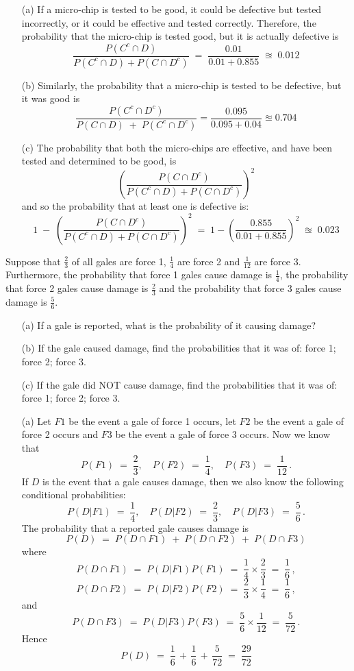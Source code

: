 \begin{ExerciseList}
\begin{itemize}
\item[(a)]
If a micro-chip is tested to be good, it could be defective but tested incorrectly, or it could be effective and tested correctly. Therefore, the probability that the micro-chip is tested good, but it is actually defective is
$$\frac{P(C^c\cap D)}{P(C^c\cap D)+P(C\cap D^c)}\;=\;\frac{0.01}{0.01+0.855}\;\approxeq\; 0.012$$
\item[(b)] 
Similarly,  the probability that a micro-chip is  tested to be defective, but it was good is
$$\frac{P(C^c\cap D^c)}{P(C\cap D)\;+\;P(C^c\cap
  D^c)}=\frac{0.095}{0.095+0.04} \approxeq 0.704$$
\item[(c)]
The  probability that  both  the micro-chips are effective, and have been
tested and determined to be good,  is
\[\left(\frac{P(C\cap D^c)}{P(C^c\cap D)+P(C\cap D^c)}\right)^2\]
and so  the probability that at least one is defective is:
$$1\;-\;\left(\frac{P(C\cap D^c)}{P(C^c\cap D)+P(C\cap
    D^c)}\right)^2\;=\;1-\left(\frac{0.855}{0.01+0.855 }\right)^2\;\approxeq\;0.023$$
\end{itemize}


\Exercise
Suppose that $\frac{2}{3}$  of all gales are  force 1, $\frac{1}{4}$  are force 2 and $\frac{1}{12}$  are force 3.  
Furthermore, the probability that force 1 gales cause damage is
$\frac{1}{4}$,  the probability that force 2 gales cause damage is
$\frac{2}{3}$  and  the probability that force 3 gales cause damage is
$\frac{5}{6}$.

\begin{itemize}
\item[(a)]If a  gale is reported,  what is the probability of it causing damage?
\item[(b)] If the gale caused damage, find  the probabilities that it
  was  of:  force 1;  force 2;  force 3.
\item[(c)] If the gale did  NOT cause damage, find  the probabilities
  that it was of: force 1; force 2; force 3.
\end{itemize}
\Answer
\begin{itemize}
\item[(a)] Let $F1$ be the event a gale of force 1 occurs, let $F2$
be the event a gale of force 2 occurs and $F3$ be the event a gale
of force 3 occurs.  Now we know that
\[ P(F1)\; =\; \frac{2}{3}, \quad  P(F2) \;= \;\frac{1}{4},  \quad P(F3) \;= \;\frac{1}{12}\,.\]
If $D$ is the event that a gale causes damage, then we also know the
following conditional probabilities:
\[ P(D|F1) \;= \;\frac{1}{4}, \quad  P(D|F2) \;=\; \frac{2}{3},  \quad  P(D|F3)\; = \;\frac{5}{6}\,.\]
The probability that a reported gale causes damage is
\[P(D)\;=\;P(D\cap F1)\;+\;P(D\cap F2)\;+\;P(D\cap F3)\]
where
\[P(D\cap F1)\;=\; P(D| F1)P(F1)\;=\;\frac{1}{4} \times \frac{2}{3}
\;=\; \frac{1}{6}\,, \]
\[P(D\cap F2)\;=\; P(D| F2)P(F2)\;=\;\frac{2}{3} \times \frac{1}{4}
\;=\; \frac{1}{6}\,, \]
and
\[P(D\cap F3)\;=\; P(D| F3)P(F3)\;=\;\frac{5}{6} \times \frac{1}{12}
\;=\; \frac{5}{72} \,.\]
Hence \[P(D)\;=\;  \frac{1}{6}\,+\,  \frac{1}{6}\,+\,\frac{5}{72}\;=\; \frac{29}{72} \]


\end{itemize}
\end{ExerciseList}
